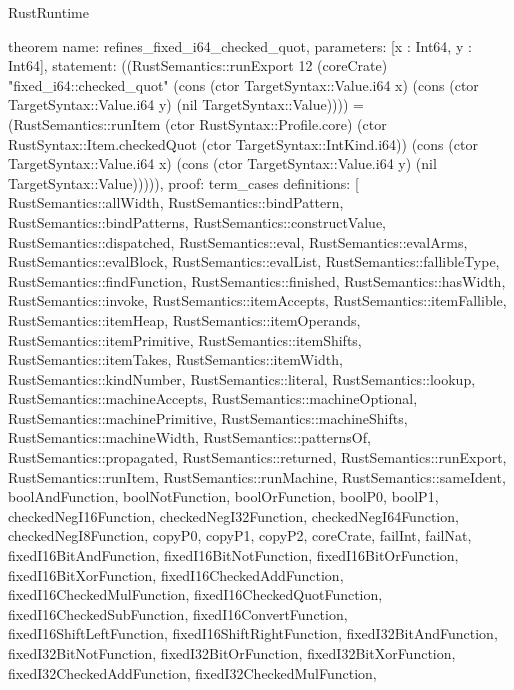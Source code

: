 \begin{lexlean}{RustRuntime}
\begin{semanticmodule}
theorem{
  name: refines_fixed_i64_checked_quot,
  parameters: [x : Int64, y : Int64],
  statement: ((RustSemantics::runExport 12 (coreCrate) "fixed_i64::checked_quot" (cons (ctor TargetSyntax::Value.i64 x) (cons (ctor TargetSyntax::Value.i64 y) (nil TargetSyntax::Value)))) = (RustSemantics::runItem (ctor RustSyntax::Profile.core) (ctor RustSyntax::Item.checkedQuot (ctor TargetSyntax::IntKind.i64)) (cons (ctor TargetSyntax::Value.i64 x) (cons (ctor TargetSyntax::Value.i64 y) (nil TargetSyntax::Value))))),
  proof: term_cases{
    definitions: [
      RustSemantics::allWidth,
      RustSemantics::bindPattern,
      RustSemantics::bindPatterns,
      RustSemantics::constructValue,
      RustSemantics::dispatched,
      RustSemantics::eval,
      RustSemantics::evalArms,
      RustSemantics::evalBlock,
      RustSemantics::evalList,
      RustSemantics::fallibleType,
      RustSemantics::findFunction,
      RustSemantics::finished,
      RustSemantics::hasWidth,
      RustSemantics::invoke,
      RustSemantics::itemAccepts,
      RustSemantics::itemFallible,
      RustSemantics::itemHeap,
      RustSemantics::itemOperands,
      RustSemantics::itemPrimitive,
      RustSemantics::itemShifts,
      RustSemantics::itemTakes,
      RustSemantics::itemWidth,
      RustSemantics::kindNumber,
      RustSemantics::literal,
      RustSemantics::lookup,
      RustSemantics::machineAccepts,
      RustSemantics::machineOptional,
      RustSemantics::machinePrimitive,
      RustSemantics::machineShifts,
      RustSemantics::machineWidth,
      RustSemantics::patternsOf,
      RustSemantics::propagated,
      RustSemantics::returned,
      RustSemantics::runExport,
      RustSemantics::runItem,
      RustSemantics::runMachine,
      RustSemantics::sameIdent,
      boolAndFunction,
      boolNotFunction,
      boolOrFunction,
      boolP0,
      boolP1,
      checkedNegI16Function,
      checkedNegI32Function,
      checkedNegI64Function,
      checkedNegI8Function,
      copyP0,
      copyP1,
      copyP2,
      coreCrate,
      failInt,
      failNat,
      fixedI16BitAndFunction,
      fixedI16BitNotFunction,
      fixedI16BitOrFunction,
      fixedI16BitXorFunction,
      fixedI16CheckedAddFunction,
      fixedI16CheckedMulFunction,
      fixedI16CheckedQuotFunction,
      fixedI16CheckedSubFunction,
      fixedI16ConvertFunction,
      fixedI16ShiftLeftFunction,
      fixedI16ShiftRightFunction,
      fixedI32BitAndFunction,
      fixedI32BitNotFunction,
      fixedI32BitOrFunction,
      fixedI32BitXorFunction,
      fixedI32CheckedAddFunction,
      fixedI32CheckedMulFunction,
}}
\end{semanticmodule}
\end{lexlean}
